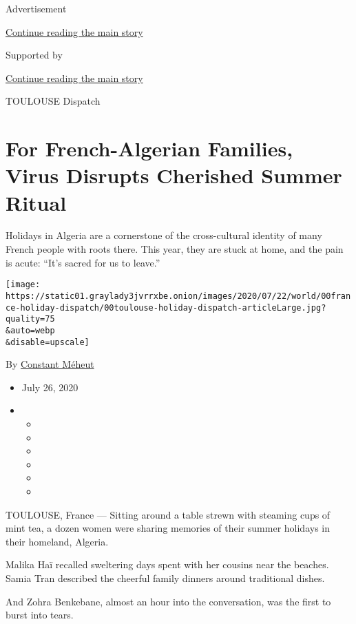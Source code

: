 Advertisement

\protect\hyperlink{after-top}{Continue reading the main story}

Supported by

\protect\hyperlink{after-sponsor}{Continue reading the main story}

TOULOUSE Dispatch

\hypertarget{for-french-algerian-families-virus-disrupts-cherished-summer-ritual}{%
\section{For French-Algerian Families, Virus Disrupts Cherished Summer
Ritual}\label{for-french-algerian-families-virus-disrupts-cherished-summer-ritual}}

Holidays in Algeria are a cornerstone of the cross-cultural identity of
many French people with roots there. This year, they are stuck at home,
and the pain is acute: ``It's sacred for us to leave.''

\texttt{[image: https://static01.graylady3jvrrxbe.onion/images/2020/07/22/world/00france-holiday-dispatch/00toulouse-holiday-dispatch-articleLarge.jpg?quality=75\\\&auto=webp\\\&disable=upscale]}

By \href{https://www.nytimes3xbfgragh.onion/by/constant-meheut}{Constant
Méheut}

\begin{itemize}
\item
  July 26, 2020
\item
  \begin{itemize}
  \item
  \item
  \item
  \item
  \item
  \item
  \end{itemize}
\end{itemize}

TOULOUSE, France --- Sitting around a table strewn with steaming cups of
mint tea, a dozen women were sharing memories of their summer holidays
in their homeland, Algeria.

Malika Haï recalled sweltering days spent with her cousins near the
beaches. Samia Tran described the cheerful family dinners around
traditional dishes.

And Zohra Benkebane, almost an hour into the conversation, was the first
to burst into tears.

